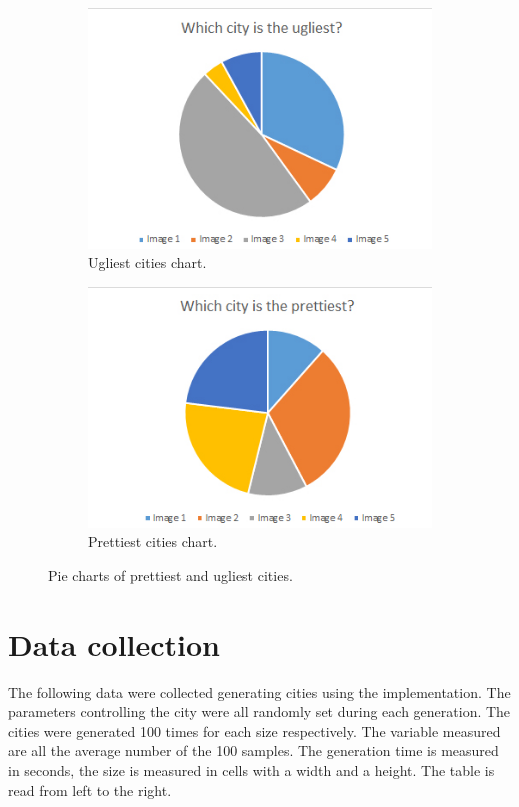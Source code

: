 	\begin{figure}[h]
		\begin{subfigure}{0.5\textwidth}
			\centering
			\includegraphics[width=0.9\linewidth]{"Images/Ugliest"}
			\caption{Ugliest cities chart.}
			\label{fig:pie-chart-ugly}
		\end{subfigure}
		\begin{subfigure}{0.5\textwidth}
			\centering
			\includegraphics[width=0.9\linewidth]{"Images/Prettiest"}
			\caption{Prettiest cities chart.}
			\label{fig:pie-chart-pretty}
		\end{subfigure}
		\caption{Pie charts of prettiest and ugliest cities.}
		\label{fig:pie-chart-ugly-pretty}
	\end{figure}


\newpage
\section{Data collection}
	The following data were collected generating cities using the implementation. The parameters controlling the city were all randomly set during each generation. The cities were generated 100 times for each size respectively. The variable measured are all the average number of the 100 samples. The generation time is measured in seconds, the size is measured in cells with a width and a height. The table is read from left to the right.
	
